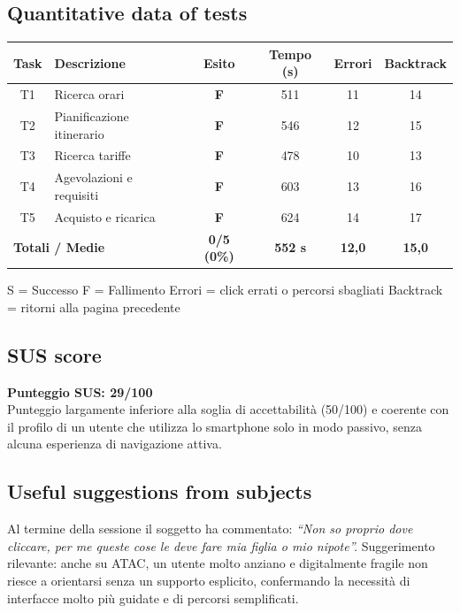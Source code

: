 \documentclass[11pt,a4paper]{article}
\begin{document}
\subsection*{Quantitative data of tests}
\begin{tcolorbox}[colback=backgroundColor,colframe=borderColor,arc=2mm]
\begin{center}
\renewcommand{\arraystretch}{1.4}
\begin{tabular}{clcccc}
\toprule
\textbf{Task} & \textbf{Descrizione} &
\textbf{Esito} & \textbf{Tempo (s)} &
\textbf{Errori} & \textbf{Backtrack} \\
\midrule
T1 & Ricerca orari             & \textbf{F} & 511 & 11 & 14 \\
T2 & Pianificazione itinerario & \textbf{F} & 546 & 12 & 15 \\
T3 & Ricerca tariffe           & \textbf{F} & 478 & 10 & 13 \\
T4 & Agevolazioni e requisiti  & \textbf{F} & 603 & 13 & 16 \\
T5 & Acquisto e ricarica       & \textbf{F} & 624 & 14 & 17 \\
\midrule
\multicolumn{2}{l}{\textbf{Totali / Medie}} &
\textbf{0/5 (0\%)} & \textbf{552 s} &
\textbf{12,0} & \textbf{15,0} \\
\bottomrule
\end{tabular}
\end{center}
\vspace{0.3cm}
\small S = Successo \quad F = Fallimento \quad Errori = click errati o percorsi sbagliati \quad Backtrack = ritorni alla pagina precedente
\end{tcolorbox}

\subsection*{SUS score}
\begin{tcolorbox}[colback=backgroundColor,colframe=borderColor,arc=2mm]
\textbf{Punteggio SUS: 29/100}\\[0.2cm]
\small Punteggio largamente inferiore alla soglia di accettabilità (50/100) e coerente con il profilo di un utente che utilizza lo smartphone solo in modo passivo, senza alcuna esperienza di navigazione attiva.
\end{tcolorbox}

\subsection*{Useful suggestions from subjects}
\begin{tcolorbox}[colback=backgroundColor,colframe=borderColor,arc=2mm]
Al termine della sessione il soggetto ha commentato:
\textit{``Non so proprio dove cliccare, per me queste cose le deve fare mia figlia o mio nipote''.}
Suggerimento rilevante: anche su ATAC, un utente molto anziano e digitalmente fragile non riesce a orientarsi senza un supporto esplicito, confermando la necessità di interfacce molto più guidate e di percorsi semplificati.
\end{tcolorbox}
\end{document}
